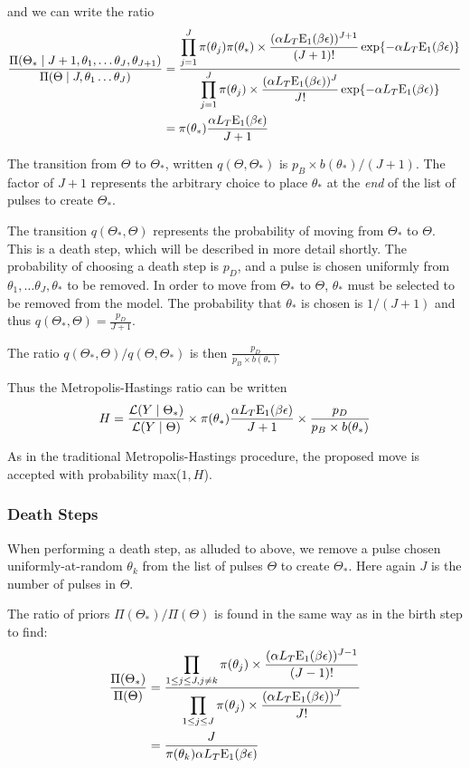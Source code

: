 \documentclass[12pt,letterpaper]{article}
\begin{document}
    and we can write the ratio 
\begin{align}
  \frac{ \Pi ( \Theta_* \mid J+1, \theta_1, \dots \theta_J, \theta_{J+1} )}{ \Pi(\Theta \mid J, \theta_1 \dots \theta_J)} & = \frac{\displaystyle\prod_{j = 1}^J \pi(\theta_j) \pi(\theta_*) \times \frac{(\alpha L_T  {\mathrm{E}_1}(\beta \epsilon) )^{J+1}}{(J+1)!} \exp\{-\alpha L_T  {\mathrm{E}_1}(\beta \epsilon)\} }{ \displaystyle\prod_{j = 1}^J \pi(\theta_j) \times \frac{(\alpha L_T  {\mathrm{E}_1}(\beta \epsilon) )^J}{J!} \exp\{-\alpha L_T  {\mathrm{E}_1}(\beta \epsilon)\}} \\
 & = \pi(\theta_*) \frac{\alpha L_T  {\mathrm{E}_1}(\beta \epsilon)}{J+1}
\end{align}

The transition from $\Theta$ to $\Theta_*$, written $q(\Theta, \Theta_*)$ is $p_B \times b(\theta_*)/ (J+1)$. The factor of $J+1$ represents the arbitrary choice to place $\theta_*$ at the \emph{end} of the list of pulses to create $\Theta_*$.

The transition $q(\Theta_*, \Theta)$ represents the probability of moving from $\Theta_*$ to $\Theta$. This is a death step, which will be described in more detail shortly. The probability of choosing a death step is $p_D$, and a pulse is chosen uniformly from $\theta_1, \dots \theta_J, \theta_*$ to be removed. In order to move from $\Theta_*$ to $\Theta$, $\theta_*$ must be selected to be removed from the model.  The probability that $\theta_*$ is chosen is $1/(J+1)$ and thus $q(\Theta_*, \Theta) = \frac{p_D}{J+1}$.

The ratio $q(\Theta_*, \Theta)/q(\Theta, \Theta_*)$ is then $\frac{p_D}{p_B \times b(\theta_*) }$

Thus the Metropolis-Hastings ratio can be written
\[ H =  \frac{\mathcal{L}(Y \mid \Theta_* )}{\mathcal{L}(Y \mid \Theta )} \times{\pi(\theta_*) \frac{\alpha L_T  {\ensuremath{\mathrm{E}_1}}(\beta \epsilon)}{J+1}}  \times \frac{p_D}{p_B \times b(\theta_*)} \]

As in the traditional Metropolis-Hastings procedure, the proposed move is accepted with probability max($1,H$).
\subsubsection{Death Steps}
When performing a death step, as alluded to above, we remove a pulse chosen uniformly-at-random $\theta_k$ from the list of pulses $\Theta$ to create $\Theta_*$. Here again $J$ is the number of pulses in $\Theta$.

The ratio of priors $\Pi(\Theta_*)/\Pi(\Theta)$ is found in the same way as in the birth step to find:
\begin{align}
\dfrac{ \Pi(\Theta_*)} {\Pi(\Theta)} & = 
\dfrac{ \displaystyle\prod_{1 \leq j \leq J, j \neq k} \pi(\theta_j) \times \frac{(\alpha L_T  {\mathrm{E}_1}(\beta \epsilon) )^{J-1}}{(J-1)!} }
{\displaystyle\prod_{1 \leq j \leq J} \pi(\theta_j) \times \frac{(\alpha L_T  {\mathrm{E}_1}(\beta \epsilon) )^{J}}{J!} } \\
& =  \frac{J}{\pi(\theta_k) \alpha L_T  {\mathrm{E}_1}(\beta \epsilon)}
\end{align}
\end{document}
